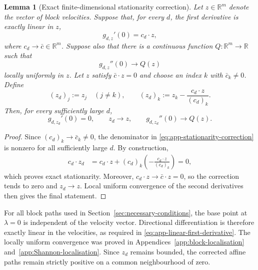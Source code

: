 \documentclass[aps,pra,11pt,onecolumn,nofootinbib,tightenlines]{revtex4-2}
\newtheorem{lemma}[theorem]{Lemma}
\theoremstyle{definition}
\begin{document}
\begin{lemma}[Exact finite-dimensional stationarity correction]
\label{lem:app-exact-stationarity}
Let $z\in\mathbb R^m$ denote the vector of block velocities.  Suppose that, for every $d$, the first derivative is exactly linear in $z$,
\begin{equation}
 g_{d,z}'(0)=c_d\cdot z,
 \label{eq:app-linear-first-derivative}
\end{equation}
where $c_d\to\bar c\in\mathbb R^m$.  Suppose also that there is a continuous function
$Q:\mathbb R^m\to\mathbb R$ such that
\begin{equation}
 g_{d,z}''(0)\longrightarrow Q(z)
 \label{eq:app-second-local-uniform}
\end{equation}
locally uniformly in $z$.  Let $z$ satisfy $\bar c\cdot z=0$ and choose an
index $k$ with $\bar c_k\neq0$.  Define
\begin{equation}
 (z_d)_j:=z_j\quad(j\neq k),
 \qquad
 (z_d)_k:=z_k-\frac{c_d\cdot z}{(c_d)_k}.
 \label{eq:app-stationarity-correction}
\end{equation}
Then, for every sufficiently large $d$,
\begin{equation}
 g_{d,z_d}'(0)=0,
 \qquad
 z_d\longrightarrow z,
 \qquad
 g_{d,z_d}''(0)\longrightarrow Q(z).
 \label{eq:app-stationarity-correction-result}
\end{equation}
\end{lemma}

\begin{proof}
Since $(c_d)_k\to\bar c_k\neq0$, the denominator in \eqref{eq:app-stationarity-correction} is nonzero for all sufficiently large $d$.  By construction,
\begin{align}
 c_d\cdot z_d
 &=c_d\cdot z
 +(c_d)_k\left(-\frac{c_d\cdot z}{(c_d)_k}\right)=0,
 \label{eq:app-stationarity-exact-proof}
\end{align}
which proves exact stationarity.  Moreover,
$c_d\cdot z\to\bar c\cdot z=0$, so the correction tends to zero and
$z_d\to z$.  Local uniform convergence of the second derivatives then gives
the final statement.
\end{proof}

For all block paths used in Section~\ref{sec:necessary-conditions}, the base point at $\lambda=0$ is independent of the velocity vector. Directional differentiation is therefore exactly linear in the velocities, as required in \eqref{eq:app-linear-first-derivative}. The locally uniform convergence was proved in Appendices~\ref{app:block-localisation} and~\ref{app:Shannon-localisation}. Since $z_d$ remains bounded, the corrected affine paths remain strictly positive on a common neighbourhood of zero.
\end{document}
